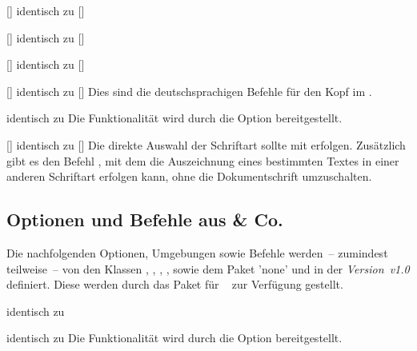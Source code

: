 \begin{Bundle*}{}
\begin{Declaration}{[]}{%
  identisch zu []%
}
\begin{Declaration}{[]}{%
  identisch zu []%
}
\begin{Declaration}{[]}{%
  identisch zu []%
}
\begin{Declaration}{[]}{%
  identisch zu []%
}
\printdeclarationlist%
%
Dies sind die deutschsprachigen Befehle für den Kopf im \CD.
\end{Declaration}
\end{Declaration}
\end{Declaration}
\end{Declaration}

\begin{Declaration}{}{%
  identisch zu %
}
\printdeclarationlist%
%
Die Funktionalität wird durch die Option  bereitgestellt.
\end{Declaration}

\begin{Declaration}{[]}{%
  identisch zu []%
}
\printdeclarationlist%
%
Die direkte Auswahl der Schriftart sollte mit  erfolgen. 
Zusätzlich gibt es den Befehl , mit dem die Auszeichnung 
eines bestimmten Textes in einer anderen Schriftart erfolgen kann, ohne die 
Dokumentschrift umzuschalten.
\end{Declaration}
%


\subsection{Optionen und Befehle aus  \& Co.}
%
Die nachfolgenden Optionen, Umgebungen sowie Befehle werden~-- zumindest 
teilweise~-- von den Klassen , , 
, ,  sowie dem Paket 
'none' und \TUDScript in der \emph{Version~v1.0} definiert. 
Diese werden durch das Paket  für \TUDScript~\vTUDScript{} 
zur Verfügung gestellt.

\begin{Declaration}{}{%
  identisch zu %
}
\begin{Declaration}{}{%
  identisch zu %
}
\printdeclarationlist%
%
Die Funktionalität wird durch die Option  bereitgestellt.
\end{Declaration}
\end{Declaration}


\end{Bundle*}
